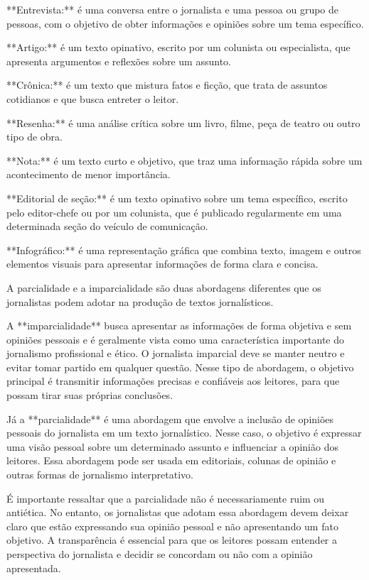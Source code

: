 {**Entrevista:** é uma conversa entre o jornalista e uma pessoa ou grupo
de pessoas, com o objetivo de obter informações e opiniões sobre um tema
específico.

**Artigo:** é um texto opinativo, escrito por um colunista ou
especialista, que apresenta argumentos e reflexões sobre um assunto.

**Crônica:** é um texto que mistura fatos e ficção, que trata de
assuntos cotidianos e que busca entreter o leitor.

**Resenha:** é uma análise crítica sobre um livro, filme, peça de teatro
ou outro tipo de obra.

**Nota:** é um texto curto e objetivo, que traz uma informação rápida
sobre um acontecimento de menor importância.

**Editorial de seção:** é um texto opinativo sobre um tema específico,
escrito pelo editor-chefe ou por um colunista, que é publicado
regularmente em uma determinada seção do veículo de comunicação.

**Infográfico:** é uma representação gráfica que combina texto, imagem e
outros elementos visuais para apresentar informações de forma clara e
concisa.

A parcialidade e a imparcialidade são duas abordagens diferentes que os
jornalistas podem adotar na produção de textos jornalísticos.

A **imparcialidade** busca apresentar as informações de forma objetiva e
sem opiniões pessoais e é geralmente vista como uma característica
importante do jornalismo profissional e ético. O jornalista imparcial
deve se manter neutro e evitar tomar partido em qualquer questão. Nesse
tipo de abordagem, o objetivo principal é transmitir informações
precisas e confiáveis aos leitores, para que possam tirar suas próprias
conclusões.

Já a **parcialidade** é uma abordagem que envolve a inclusão de opiniões
pessoais do jornalista em um texto jornalístico. Nesse caso, o objetivo
é expressar uma visão pessoal sobre um determinado assunto e influenciar
a opinião dos leitores. Essa abordagem pode ser usada em editoriais,
colunas de opinião e outras formas de jornalismo interpretativo.

É importante ressaltar que a parcialidade não é necessariamente ruim ou
antiética. No entanto, os jornalistas que adotam essa abordagem devem
deixar claro que estão expressando sua opinião pessoal e não
apresentando um fato objetivo. A transparência é essencial para que os
leitores possam entender a perspectiva do jornalista e decidir se
concordam ou não com a opinião apresentada.

}
